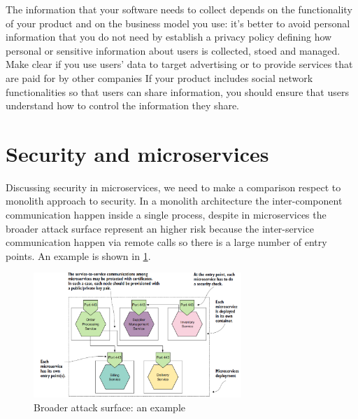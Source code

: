 \documentclass[10pt,a4paper]{report}
\begin{document}
The information that your software needs to collect depends on the functionality of your product and on the business model you use: it's better to avoid personal information that you do not need by establish a privacy policy defining how personal or sensitive information about users is collected, stoed and managed. Make clear if you use users’ data to target advertising or to provide services that are paid for by other companies
If your product includes social network functionalities so that users can share information, you should ensure that users understand how to control the information they share.

\section{Security and microservices}
Discussing security in microservices, we need to make a comparison respect to monolith approach to security. In a monolith architecture the inter-component communication happen inside a single process, despite in microservices the broader attack surface represent an higher risk because the inter-service communication happen via remote calls so there is a large number of entry points. An example is shown in \ref{image94}.  
\begin{figure}[h]
	\centering
	\includegraphics[width=0.7\textwidth]{image94}
	\caption{Broader attack surface: an example}
	\label{image94}
\end{figure} 
\end{document}
